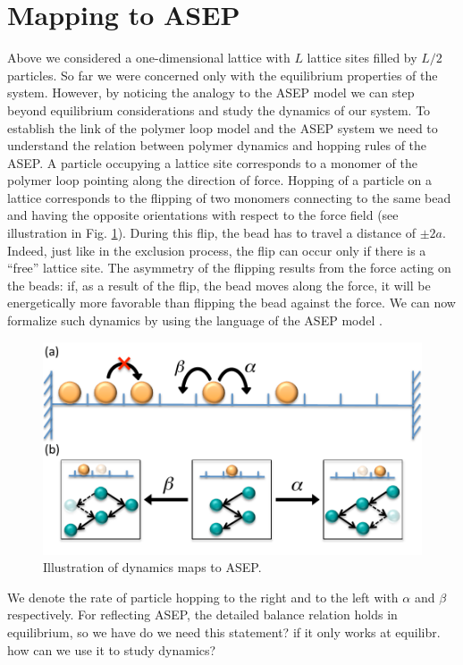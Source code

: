 \documentclass[aps,showpacs,twocolumn,floatfix,prx,superscriptaddress]{revtex4-1}
\begin{document}
\section{Mapping to ASEP}\label{sec:asep}
Above we considered a one-dimensional lattice with $L$ lattice sites filled by $L/2$ particles. So far we were concerned only with the equilibrium properties of the system. However, by noticing the analogy to the ASEP model we can step
beyond equilibrium considerations and study the dynamics of our system. To establish the link of the polymer loop model and the ASEP system we need to understand the relation between polymer dynamics and hopping rules of the ASEP.  A particle occupying a lattice site corresponds to a monomer of the polymer loop pointing along the direction of force. 
Hopping of a particle on a lattice corresponds to the flipping of two monomers connecting to the same bead and having the opposite orientations with respect to the force field (see illustration in Fig. \ref{fig:asep}). During this flip, the bead has to travel a distance of $\pm2a$. Indeed, just like in the exclusion process, the flip can occur only if there is a ``free'' lattice site. The asymmetry of the flipping results from the force acting on the beads: if, as a result of the flip, the bead moves along the force, it will be energetically more favorable than flipping the bead against the force. We can now formalize such dynamics by using the language of the ASEP model \cite{Derrida1998,Schutz2001}. 
 \begin{figure}[htpb]
     \centering
     \includegraphics[width=1.0\linewidth]{asep}
     \caption{Illustration of dynamics maps to ASEP.}
     \label{fig:asep}
 \end{figure}
We denote the rate of particle hopping to the right and to the left with $\alpha$ and $\beta$ respectively. For reflecting ASEP, the detailed balance relation holds in equilibrium, so we have {\color{red} do we need this statement? if it only works at equilibr. how can we use it to study dynamics?}
\end{document}
